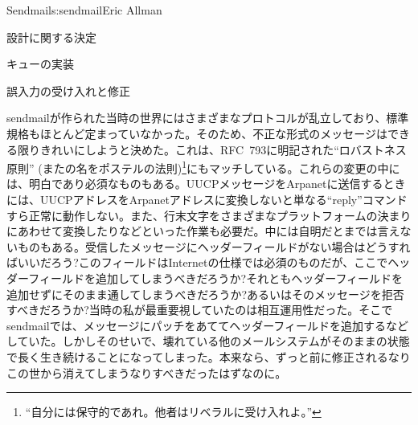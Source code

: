 \begin{aosachapter}{Sendmail}{s:sendmail}{Eric Allman}
\begin{aosasect1}{設計に関する決定}
\begin{aosasect2}{キューの実装}
\end{aosasect2}

\begin{aosasect2}{誤入力の受け入れと修正}

sendmailが作られた当時の世界にはさまざまなプロトコルが乱立しており、標準規格もほとんど定まっていなかった。そのため、不正な形式のメッセージはできる限りきれいにしようと決めた。これは、RFC~793に明記された``ロバストネス原則'' (またの名をポステルの法則)\footnote{``自分には保守的であれ。他者はリベラルに受け入れよ。''}にもマッチしている。これらの変更の中には、明白であり必須なものもある。UUCPメッセージをArpanetに送信するときには、UUCPアドレスをArpanetアドレスに変換しないと単なる``reply''コマンドすら正常に動作しない。また、行末文字をさまざまなプラットフォームの決まりにあわせて変換したりなどといった作業も必要だ。中には自明だとまでは言えないものもある。受信したメッセージにヘッダーフィールドがない場合はどうすればいいだろう?このフィールドはInternetの仕様では必須のものだが、ここでヘッダーフィールドを追加してしまうべきだろうか?それともヘッダーフィールドを追加せずにそのまま通してしまうべきだろうか?あるいはそのメッセージを拒否すべきだろうか?当時の私が最重要視していたのは相互運用性だった。そこでsendmailでは、メッセージにパッチをあててヘッダーフィールドを追加するなどしていた。しかしそのせいで、壊れている他のメールシステムがそのままの状態で長く生き続けることになってしまった。本来なら、ずっと前に修正されるなりこの世から消えてしまうなりすべきだったはずなのに。


\end{aosasect2}
\end{aosasect1}
\end{aosachapter}

